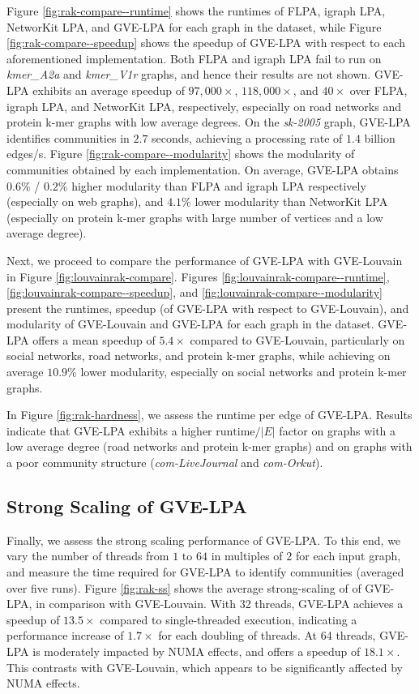 Figure \ref{fig:rak-compare--runtime} shows the runtimes of FLPA, igraph LPA, NetworKit LPA, and GVE-LPA for each graph in the dataset, while Figure \ref{fig:rak-compare--speedup} shows the speedup of GVE-LPA with respect to each aforementioned implementation. Both FLPA and igraph LPA fail to run on \textit{kmer\_A2a} and \textit{kmer\_V1r} graphs, and hence their results are not shown. GVE-LPA exhibits an average speedup of $97,000\times$, $118,000\times$, and $40\times$ over FLPA, igraph LPA, and NetworKit LPA, respectively, especially on road networks and protein k-mer graphs with low average degrees. On the \textit{sk-2005} graph, GVE-LPA identifies communities in $2.7$ seconds, achieving a processing rate of $1.4$ billion edges/s. Figure \ref{fig:rak-compare--modularity} shows the modularity of communities obtained by each implementation. On average, GVE-LPA obtains $0.6\%$ / $0.2\%$ higher modularity than FLPA and igraph LPA respectively (especially on web graphs), and $4.1\%$ lower modularity than NetworKit LPA (especially on protein k-mer graphs with large number of vertices and a low average degree).




Next, we proceed to compare the performance of GVE-LPA with GVE-Louvain in Figure \ref{fig:louvainrak-compare}. Figures \ref{fig:louvainrak-compare--runtime}, \ref{fig:louvainrak-compare--speedup}, and \ref{fig:louvainrak-compare--modularity} present the runtimes, speedup (of GVE-LPA with respect to GVE-Louvain), and modularity of GVE-Louvain and GVE-LPA for each graph in the dataset. GVE-LPA offers a mean speedup of $5.4\times$ compared to GVE-Louvain, particularly on social networks, road networks, and protein k-mer graphs, while achieving on average $10.9\%$ lower modularity, especially on social networks and protein k-mer graphs.

In Figure \ref{fig:rak-hardness}, we assess the runtime per edge of GVE-LPA. Results indicate that GVE-LPA exhibits a higher $\text{runtime}/|E|$ factor on graphs with a low average degree (road networks and protein k-mer graphs) and on graphs with a poor community structure (\textit{com-LiveJournal} and \textit{com-Orkut}).




\subsection{Strong Scaling of GVE-LPA}

Finally, we assess the strong scaling performance of GVE-LPA. To this end, we vary the number of threads from $1$ to $64$ in multiples of $2$ for each input graph, and measure the time required for GVE-LPA to identify communities (averaged over five runs). Figure \ref{fig:rak-ss} shows the average strong-scaling of of GVE-LPA, in comparison with GVE-Louvain. With 32 threads, GVE-LPA achieves a speedup of $13.5\times$ compared to single-threaded execution, indicating a performance increase of $1.7\times$ for each doubling of threads. At 64 threads, GVE-LPA is moderately impacted by NUMA effects, and offers a speedup of $18.1\times$. This contrasts with GVE-Louvain, which appears to be significantly affected by NUMA effects.
